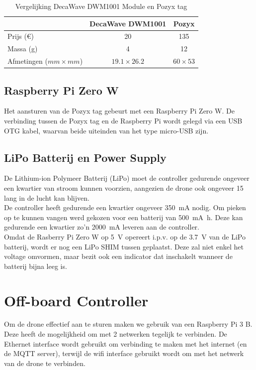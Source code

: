 \begin{table}[p]
\centering
\begin{tabular}{ | l | c | c | } \hline
& DecaWave DWM1001 & Pozyx \\
\hline 
\hline
Prijs (\euro{}) & 20 & 135 \\ 
\hline
Massa (g) & 4 & 12 \\ 
\hline
Afmetingen ($mm \times mm$) & $19.1 \times 26.2$ & $60 \times 53$ \\ 
\hline
\end{tabular}
\caption[Vergelijking DecaWave DWM1001 Module en Pozyx tag]{Vergelijking DecaWave DWM1001 Module en Pozyx tag}
\label{tab:decavspozyx}
\end{table}

\subsection{Raspberry Pi Zero W} \label{sec:raspberry_pi}

Het aansturen van de Pozyx tag gebeurt met een Raspberry Pi Zero W. De verbinding tussen de Pozyx tag en de Raspberry Pi wordt gelegd via een USB OTG kabel, waarvan beide uiteinden van het type micro-USB zijn.

\subsection{LiPo Batterij en Power Supply} \label{sec:lipo}
De Lithium-ion Polymeer Batterij (LiPo) moet de controller gedurende ongeveer een kwartier van stroom kunnen voorzien, aangezien de drone ook ongeveer \SI{15}{\min} lang in de lucht kan blijven.\\
De controller heeft gedurende een kwartier ongeveer \SI{350}{\mA} nodig.
Om pieken op te kunnen vangen werd gekozen voor een batterij van \SI{500}{\mA\hour}.
Deze kan gedurende een kwartier zo'n \SI{2000}{\mA} leveren aan de controller.\\

Omdat de Rasberry Pi Zero W op \SI{5}{\V} opereert i.p.v. op de \SI{3.7}{\V} van de LiPo batterij, wordt er nog een LiPo SHIM tussen geplaatst. Deze zal niet enkel het voltage omvormen, maar bezit ook een indicator dat inschakelt wanneer de batterij bijna leeg is.

\section{Off-board Controller} \label{sec:offboard_controller}
Om de drone effectief aan te sturen maken we gebruik van een Raspberry Pi 3 B.
Deze heeft de mogelijkheid om met 2 netwerken tegelijk te verbinden. De Ethernet interface wordt gebruikt om verbinding te maken met het internet (en de MQTT server), terwijl de wifi interface gebruikt wordt om met het netwerk van de drone te verbinden.\\

